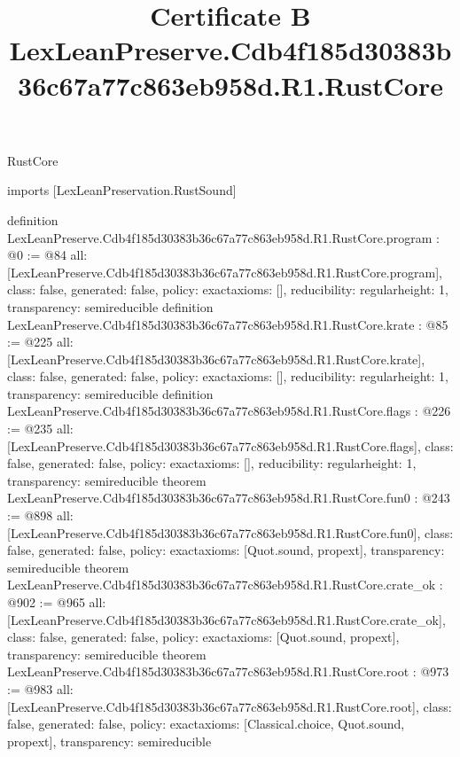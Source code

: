 \begin{lexlean}{RustCore}
\title{Certificate B LexLeanPreserve.Cdb4f185d30383b36c67a77c863eb958d.R1.RustCore}
\begin{coremodule}
imports [LexLeanPreservation.RustSound]

definition LexLeanPreserve.Cdb4f185d30383b36c67a77c863eb958d.R1.RustCore.program : @0 := @84 {
  all: [LexLeanPreserve.Cdb4f185d30383b36c67a77c863eb958d.R1.RustCore.program],
  class: false,
  generated: false,
  policy: exact{axioms: []},
  reducibility: regular{height: 1},
  transparency: semireducible
}
definition LexLeanPreserve.Cdb4f185d30383b36c67a77c863eb958d.R1.RustCore.krate : @85 := @225 {
  all: [LexLeanPreserve.Cdb4f185d30383b36c67a77c863eb958d.R1.RustCore.krate],
  class: false,
  generated: false,
  policy: exact{axioms: []},
  reducibility: regular{height: 1},
  transparency: semireducible
}
definition LexLeanPreserve.Cdb4f185d30383b36c67a77c863eb958d.R1.RustCore.flags : @226 := @235 {
  all: [LexLeanPreserve.Cdb4f185d30383b36c67a77c863eb958d.R1.RustCore.flags],
  class: false,
  generated: false,
  policy: exact{axioms: []},
  reducibility: regular{height: 1},
  transparency: semireducible
}
theorem LexLeanPreserve.Cdb4f185d30383b36c67a77c863eb958d.R1.RustCore.fun0 : @243 := @898 {
  all: [LexLeanPreserve.Cdb4f185d30383b36c67a77c863eb958d.R1.RustCore.fun0],
  class: false,
  generated: false,
  policy: exact{axioms: [Quot.sound, propext]},
  transparency: semireducible
}
theorem LexLeanPreserve.Cdb4f185d30383b36c67a77c863eb958d.R1.RustCore.crate_ok : @902 := @965 {
  all: [LexLeanPreserve.Cdb4f185d30383b36c67a77c863eb958d.R1.RustCore.crate_ok],
  class: false,
  generated: false,
  policy: exact{axioms: [Quot.sound, propext]},
  transparency: semireducible
}
theorem LexLeanPreserve.Cdb4f185d30383b36c67a77c863eb958d.R1.RustCore.root : @973 := @983 {
  all: [LexLeanPreserve.Cdb4f185d30383b36c67a77c863eb958d.R1.RustCore.root],
  class: false,
  generated: false,
  policy: exact{axioms: [Classical.choice, Quot.sound, propext]},
  transparency: semireducible
}


\end{coremodule}
\end{lexlean}
